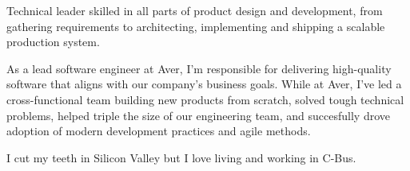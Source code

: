 

\begin{cvparagraph}

Technical leader skilled in all parts of product design and development, from gathering requirements to architecting, implementing and shipping a scalable production system.

As a lead software engineer at Aver, I'm responsible for delivering high-quality software that aligns with our company's business goals.
While at Aver, I've led a cross-functional team building new products from scratch, solved tough technical problems, helped triple the size of our engineering team, and succesfully drove adoption of modern development practices and agile methods.

I cut my teeth in Silicon Valley but I love living and working in C-Bus.

\end{cvparagraph}
